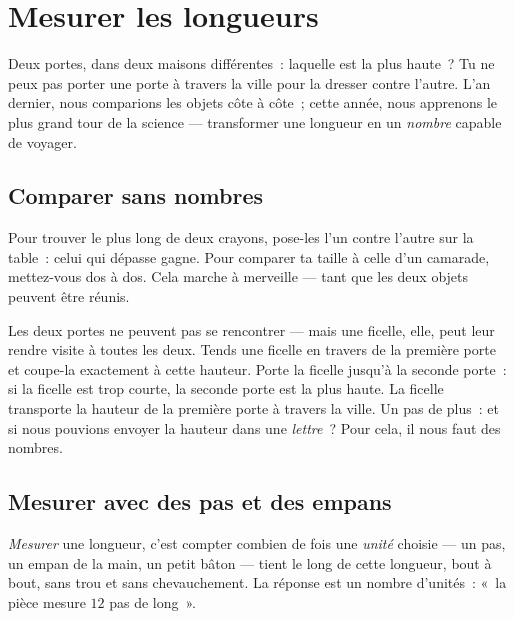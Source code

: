 \chapter{Mesurer les longueurs}\label{ch:g2:measuring-length}

Deux portes, dans deux maisons différentes~: laquelle est la plus
haute~? Tu ne peux pas porter une porte à travers la ville pour la
dresser contre l'autre. L'an dernier, nous comparions les objets côte
à côte~; cette année, nous apprenons le plus grand tour de la
science --- transformer une longueur en un \emph{nombre} capable de
voyager.

\section{Comparer sans nombres}

\begin{example}\label{ex:g2:measuring-length:sidebyside}
Pour trouver le plus long de deux crayons, pose-les l'un contre
l'autre sur la table~: celui qui dépasse gagne. Pour comparer ta
taille à celle d'un camarade, mettez-vous dos à dos. Cela marche à
merveille --- tant que les deux objets peuvent être réunis.
\end{example}

\begin{example}\label{ex:g2:measuring-length:string}
Les deux portes ne peuvent pas se rencontrer --- mais une ficelle,
elle, peut leur rendre visite à toutes les deux. Tends une ficelle en
travers de la première porte et coupe-la exactement à cette hauteur.
Porte la ficelle jusqu'à la seconde porte~: si la ficelle est trop
courte, la seconde porte est la plus haute. La ficelle transporte la
hauteur de la première porte à travers la ville. Un pas de plus~: et
si nous pouvions envoyer la hauteur dans une \emph{lettre}~? Pour
cela, il nous faut des nombres.
\end{example}

\section{Mesurer avec des pas et des empans}

\begin{definition}\label{def:g2:measuring-length:measure}
\emph{Mesurer} une longueur, c'est compter combien de
fois une \emph{unité} choisie --- un pas, un empan de la
main, un petit bâton --- tient le long de cette longueur, bout à
bout, sans trou et sans chevauchement. La réponse est un nombre
d'unités~: «~la pièce mesure $12$ pas de long~».
\end{definition}

